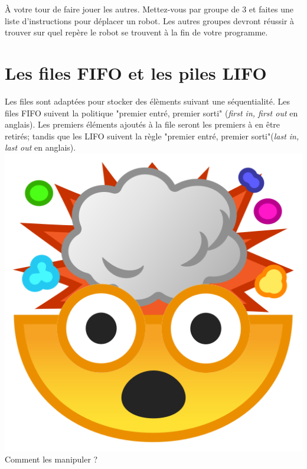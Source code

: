 À votre tour de faire jouer les autres. Mettez-vous par groupe de 3 et faites une liste d'instructions pour déplacer un robot. Les autres groupes devront réussir à trouver sur quel repère le robot se trouvent à la fin de votre programme.


\newpage
\section{Les files FIFO et les piles LIFO}

Les files sont adaptées pour stocker des élèments suivant une séquentialité. Les files FIFO suivent la politique "premier entré, premier sorti" (\textit{first in, first out} en anglais). Les premiers éléments ajoutés à la file seront les premiers à en être retirés; tandis que les LIFO suivent la règle "premier entré, premier sorti"(\textit{last in, last out} en anglais).\\

\includegraphics[scale=0.03]{Thème 1 – Structures de données/Chapitre 1 - Interface et implémentation/BLOB/mindblow}{\selectfont
Comment les manipuler ?\\
}

